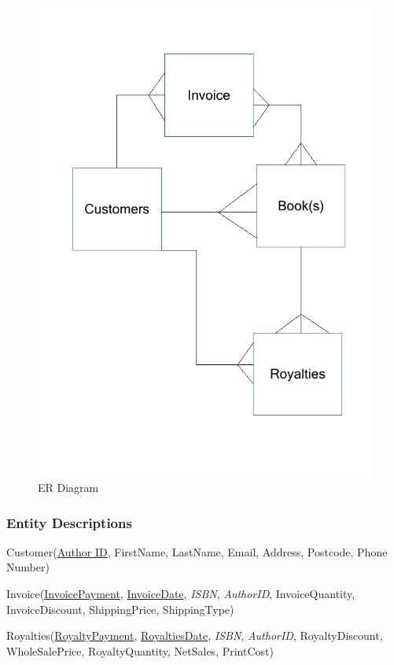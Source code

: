 \begin{figure}[H]
    \caption{ER Diagram} \label{ER_Diagram.pdf}
    \includegraphics[width=\textwidth]{./Design/ER_Diagram.pdf}
\end{figure}


\subsubsection{Entity Descriptions}

Customer(\underline{Author ID}, FirstName, LastName, Email, Address, Postcode, Phone Number)

Invoice(\underline{InvoicePayment}, \underline{InvoiceDate}, \emph{ISBN}, \emph{AuthorID}, InvoiceQuantity, InvoiceDiscount, ShippingPrice, ShippingType)

Royalties(\underline{RoyaltyPayment}, \underline{RoyaltiesDate}, \emph{ISBN}, \emph{AuthorID}, RoyaltyDiscount, WholeSalePrice, RoyaltyQuantity, NetSales, PrintCost)

